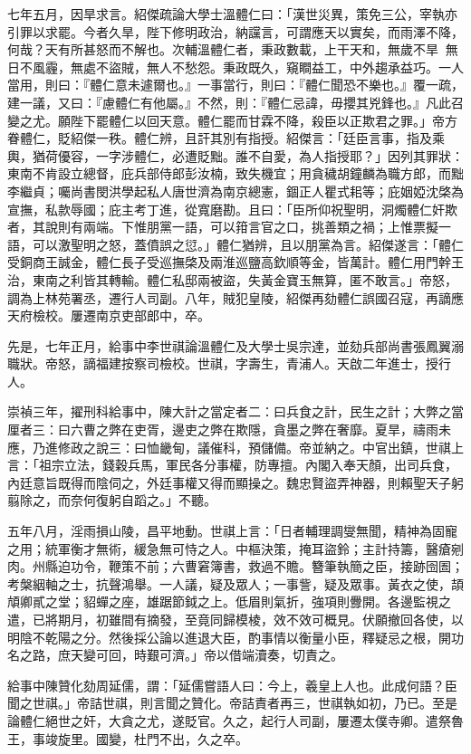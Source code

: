 \begin{pinyinscope}
七年五月，因旱求言。紹傑疏論大學士溫體仁曰：「漢世災異，策免三公，宰執亦引罪以求罷。今者久旱，陛下修明政治，納讜言，可謂應天以實矣，而雨澤不降，何哉？天有所甚怒而不解也。次輔溫體仁者，秉政數載，上干天和，無歲不旱，無日不風霾，無處不盜賊，無人不愁怨。秉政既久，窺瞷益工，中外趨承益巧。一人當用，則曰：『體仁意未遽爾也。』一事當行，則曰：『體仁聞恐不樂也。』覆一疏，建一議，又曰：『慮體仁有他屬。』不然，則：『體仁忌諱，毋攖其兇鋒也。』凡此召變之尤。願陛下罷體仁以回天意。體仁罷而甘霖不降，殺臣以正欺君之罪。」帝方眷體仁，貶紹傑一秩。體仁辨，且訐其別有指授。紹傑言：「廷臣言事，指及乘輿，猶荷優容，一字涉體仁，必遭貶黜。誰不自愛，為人指授耶？」因列其罪狀：東南不肯設立總督，庇兵部侍郎彭汝楠，致失機宜；用貪穢胡鐘麟為職方郎，而黜李繼貞；囑尚書閔洪學起私人唐世濟為南京總憲，錮正人瞿式耜等；庇姻婭沈棨為宣撫，私款辱國；庇主考丁進，從寬磨勘。且曰：「臣所仰祝聖明，洞燭體仁奸欺者，其說則有兩端。下惟朋黨一語，可以箝言官之口，挑善類之禍；上惟票擬一語，可以激聖明之怒，蓋僨誤之愆。」體仁猶辨，且以朋黨為言。紹傑遂言：「體仁受銅商王誠金，體仁長子受巡撫棨及兩淮巡鹽高欽順等金，皆萬計。體仁用門幹王治，東南之利皆其轉輸。體仁私邸兩被盜，失黃金寶玉無算，匿不敢言。」帝怒，調為上林苑署丞，遷行人司副。八年，賊犯皇陵，紹傑再劾體仁誤國召寇，再謫應天府檢校。屢遷南京吏部郎中，卒。

先是，七年正月，給事中李世祺論溫體仁及大學士吳宗達，並劾兵部尚書張鳳翼溺職狀。帝怒，謫福建按察司檢校。世祺，字壽生，青浦人。天啟二年進士，授行人。

崇禎三年，擢刑科給事中，陳大計之當定者二：曰兵食之計，民生之計；大弊之當厘者三：曰六曹之弊在吏胥，邊吏之弊在欺隱，貪墨之弊在奢靡。夏旱，禱雨未應，乃進修政之說三：曰恤畿甸，議催科，預儲備。帝並納之。中官出鎮，世祺上言：「祖宗立法，錢穀兵馬，軍民各分事權，防專擅。內閣入奉天顏，出司兵食，內廷意旨既得而陰伺之，外廷事權又得而顯操之。魏忠賢盜弄神器，則賴聖天子躬翦除之，而奈何復躬自蹈之。」不聽。

五年八月，淫雨損山陵，昌平地動。世祺上言：「日者輔理調燮無聞，精神為固寵之用；統軍衡才無術，緩急無可恃之人。中樞決策，掩耳盜鈴；主計持籌，醫瘡剜肉。州縣迫功令，鞭策不前；六曹窘簿書，救過不贍。簪筆執簡之臣，接跡囹圄；考槃絪軸之士，抗聲鴻舉。一人議，疑及眾人；一事訾，疑及眾事。黃衣之使，頡頏卿貳之堂；貂蟬之座，雄踞節鉞之上。低眉則氣折，強項則釁開。各邊監視之遣，已將期月，初雖間有摘發，至竟同歸模棱，效不效可概見。伏願撤回各使，以明陰不乾陽之分。然後採公論以進退大臣，酌事情以衡量小臣，釋疑忌之根，開功名之路，庶天變可回，時艱可濟。」帝以借端瀆奏，切責之。

給事中陳贊化劾周延儒，謂：「延儒嘗語人曰：今上，羲皇上人也。此成何語？臣聞之世祺。」帝詰世祺，則言聞之贊化。帝詰責者再三，世祺執如初，乃已。至是論體仁絕世之奸，大貪之尤，遂貶官。久之，起行人司副，屢遷太僕寺卿。遣祭魯王，事竣旋里。國變，杜門不出，久之卒。


\end{pinyinscope}
